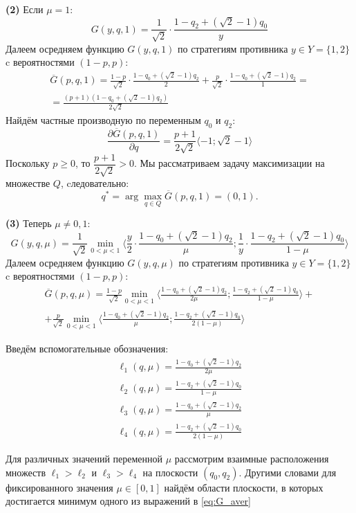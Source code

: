 	
\textbf{(2)}
Если $\mu=1:$
$$
	G(y,q,1)=\frac{1}{\sqrt{2}}\cdot \frac{1-q_2+(\sqrt{2}-1)q_0}{y}
$$	
Далеем осредняем функцию $G(y,q,1)$ по стратегиям 
противника $y \in Y=\{1,2\}$ c вероятностями $(1-p,p)$:
\begin{gather*}
	\overline G(p,q,1)=
	\frac{1-p}{\sqrt{2}} \cdot \frac{1-q_0+(\sqrt{2}-1)q_2}{2}+
	\frac{p}{\sqrt{2}} \cdot \frac{1-q_0+(\sqrt{2}-1)q_2}{1}=\\
	=\frac{(p+1)(1-q_0+(\sqrt{2}-1)q_2)}{2\sqrt{2}}
\end{gather*}
Найдём частные производную по переменным $q_0$ и $q_2$:	
$$
	\frac{\partial \overline G(p,q,1)}{\partial q}
	=\frac{p+1}{2\sqrt{2}} \langle -1; \sqrt{2}-1\rangle
$$
Поскольку $p \geqslant 0$, то $\dfrac{p+1}{2\sqrt{2}} > 0 $.
Мы рассматриваем задачу максимизации на множестве $Q$, 
cледовательно:
$$
	q^* = \arg \max \limits_{q\in Q} \overline G(p,q,1)=(0,1).
$$


\textbf{(3)} 
Теперь $\mu \neq 0,1$:
$$
	G(y,q,\mu)=\frac{1}{\sqrt{2}}\min \limits_{0<\mu<1}
	\big \langle
		\frac{y}{2} \cdot \frac{1-q_0+(\sqrt{2}-1)q_2}{\mu};
		\frac{1}{y} \cdot \frac{1-q_2+(\sqrt{2}-1)q_0}{1-\mu}
	\big \rangle	
$$
Далеем осредняем функцию $G(y,q,\mu)$ по стратегиям 
противника $y \in Y=\{1,2\}$ c вероятностями $(1-p,p)$:
\begin{multline}
	\label{eq:G_aver}
	\overline G(p,q,\mu)=\frac{1-p}{\sqrt{2}}\min \limits_{0<\mu<1}
	\big \langle
		\frac{1-q_0+(\sqrt{2}-1)q_2}{2\mu};
		\frac{1-q_2+(\sqrt{2}-1)q_0}{1-\mu}
	\big \rangle + \\
	+\frac{p}{\sqrt{2}}\min \limits_{0<\mu<1}
	\big \langle
		\frac{1-q_0+(\sqrt{2}-1)q_2}{\mu};
		\frac{1-q_2+(\sqrt{2}-1)q_0}{2(1-\mu)}
	\big \rangle 
\end{multline}
	
Введём вспомогательные обозначения:
\begin{gather*}
	\ell_1(q,\mu)=\frac{1-q_0+(\sqrt{2}-1)q_2}{2\mu} \\
	\ell_2(q,\mu)=\frac{1-q_2+(\sqrt{2}-1)q_0}{1-\mu} \\
	\ell_3(q,\mu)=\frac{1-q_0+(\sqrt{2}-1)q_2}{\mu} \\
	\ell_4(q,\mu)=\frac{1-q_2+(\sqrt{2}-1)q_0}{2(1-\mu)}
\end{gather*}
	
	
Для различных значений переменной $\mu$ рассмотрим 
взаимные расположения множеств $\ell_1>\ell_2$ и $\ell_3>\ell_4$
на плоскости $(q_0,q_2)$. Другими словами для фиксированного 
значения $\mu \in [0,1]$ найдём области плоскости, в которых 
достигается минимум одного из выражений в \eqref{eq:G_aver}
	
